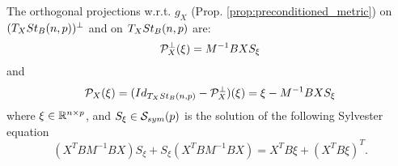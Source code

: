 \documentclass[11pt,a4paper]{article}
\begin{document}
\begin{proposition}
The orthogonal projections w.r.t. $g_X$ (Prop. \ref{prop:preconditioned_metric}) on $(T_XSt_B(n,p))^\perp$ and on $T_XSt_B(n,p)$ are:
\begin{equation}\label{eqn:normal_projector}
\mathcal{P}^\perp_X(\xi) = M^{-1}BXS_{\xi}
\end{equation}
and 
\begin{equation}\label{eqn:tangent_projector}
\mathcal{P}_X(\xi) = (Id_{T_XSt_B(n,p)} - \mathcal{P}^\perp_X)(\xi) = \xi - M^{-1}BXS_\xi
\end{equation}
where $\xi\in \mathbb{R}^{n\times p}$, and $S_\xi\in \mathcal{S}_{sym}(p)$ is the solution of the following Sylvester equation
\begin{equation*}
(X^TBM^{-1}BX)S_\xi + S_\xi (X^TBM^{-1}BX) = X^TB\xi + (X^TB\xi)^T.
\end{equation*}
\end{proposition}
\end{document}
